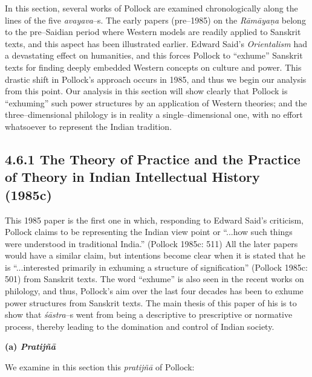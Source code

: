 In this section, several works of Pollock are examined chronologically along the lines of the five \textit{avayava}–s. The early papers (pre–1985) on the \textit{Rāmāyaṇa} belong to the pre–Saidian period where Western models are readily applied to Sanskrit texts, and this aspect has been illustrated earlier. Edward Said’s \textit{Orientalism} had a devastating effect on humanities, and this forces Pollock to “exhume” Sanskrit texts for finding deeply embedded Western concepts on culture and power. This drastic shift in Pollock’s approach occurs in 1985, and thus we begin our analysis from this point. Our analysis in this section will show clearly that Pollock is “exhuming” such power structures by an application of Western theories; and the three–dimensional philology is in reality a single–dimensional one, with no effort whatsoever to represent the Indian tradition.

\vspace{-.3cm}

\subsection*{4.6.1 The Theory of Practice and the Practice of Theory in Indian Intellectual History (1985c)}

\vspace{-.2cm}

This 1985 paper is the first one in which, responding to Edward Said’s criticism, Pollock claims to be representing the Indian view point or “...how such things were understood in traditional India.” (Pollock 1985c: 511) All the later papers would have a similar claim, but intentions become clear when it is stated that he is “...interested primarily in exhuming a structure of signification” (Pollock 1985c: 501) from Sanskrit texts. The word “exhume” is also seen in the recent works on philology, and thus, Pollock’s aim over the last four decades has been to exhume power structures from Sanskrit texts. The main thesis of this paper of his is to show that \textit{śāstra}–s went from being a descriptive to prescriptive or normative process, thereby leading to the domination and control of Indian society.

\textbf{(a) \textit{Pratijñā }}

We examine in this section this \textit{pratijñā} of Pollock:

